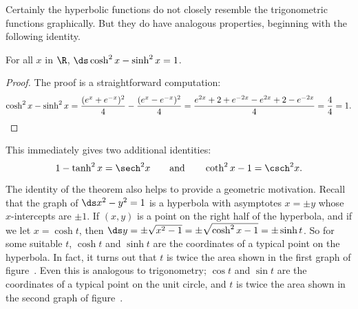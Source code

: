 % 

Certainly the hyperbolic functions do not closely resemble the
trigonometric functions graphically. But they do have analogous
properties, beginning with the following identity.


\begin{theorem} For all $x$ in $\R$, $\ds \cosh ^2 x -\sinh ^2 x = 1$.
\end{theorem}
\begin{proof} The proof is a straightforward computation:
$$\cosh ^2 x -\sinh ^2 x =
 {(e^x +e^{-x} )^2\over 4} -{(e^x -e^{-x} )^2\over 4}=
 {e^{2x} + 2 + e^{-2x } - e^{2x } + 2 - e^{-2x}\over 4}=
 {4\over 4} = 1.
$$
\end{proof}

This immediately gives two additional identities:
$$1-\tanh^2 x =\sech^2 x\qquad\hbox{and}\qquad
\coth^2 x - 1  =\csch^2 x.$$

The identity of the theorem also helps to provide a geometric
motivation. Recall that the graph of $\ds x^2 -y^2 =1$ is a hyperbola
with asymptotes $x=\pm y$ whose $x$-intercepts are $\pm 1$. If
$(x,y)$ is a point on the right half of the hyperbola, and if
we let $x=\cosh t$, then
$\ds y=\pm\sqrt{x^2-1}=\pm\sqrt{\cosh^2x-1}=\pm\sinh t$. So for some
suitable $t$, $\cosh t$ and $\sinh t$ are the coordinates of a typical
point on the hyperbola. In fact, it turns out that $t$ is twice the
area shown in the first graph of 
figure~.  Even
this is analogous to trigonometry; $\cos t$ and $\sin t$ are the
coordinates of a typical point on the unit circle, and $t$ is twice
the area shown in the second graph of figure~. 


